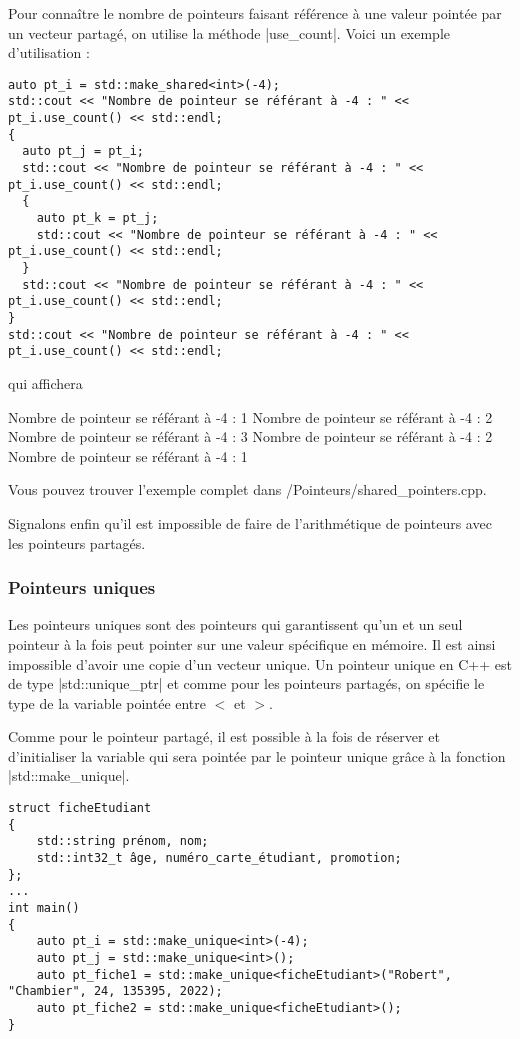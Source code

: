 Pour connaître le nombre de pointeurs faisant référence à une valeur pointée par un vecteur partagé,
on utilise la méthode |use_count|. Voici un exemple d'utilisation :
\begin{lstlisting}[caption=Lire le nombre de pointeur faisant référence à une valeur]
auto pt_i = std::make_shared<int>(-4);
std::cout << "Nombre de pointeur se référant à -4 : " << pt_i.use_count() << std::endl;
{
  auto pt_j = pt_i;
  std::cout << "Nombre de pointeur se référant à -4 : " << pt_i.use_count() << std::endl;
  {
    auto pt_k = pt_j;
    std::cout << "Nombre de pointeur se référant à -4 : " << pt_i.use_count() << std::endl;
  }
  std::cout << "Nombre de pointeur se référant à -4 : " << pt_i.use_count() << std::endl;
}
std::cout << "Nombre de pointeur se référant à -4 : " << pt_i.use_count() << std::endl;
\end{lstlisting}

qui affichera
\begin{inverseverbatim}
Nombre de pointeur se référant à -4 : 1
Nombre de pointeur se référant à -4 : 2
Nombre de pointeur se référant à -4 : 3
Nombre de pointeur se référant à -4 : 2
Nombre de pointeur se référant à -4 : 1
\end{inverseverbatim}

Vous pouvez trouver l'exemple complet dans \verb@Exemples/Pointeurs/shared_pointers.cpp\verb@.

Signalons enfin qu'il est impossible de faire de l'arithmétique de pointeurs avec les pointeurs partagés.

\subsubsection{Pointeurs uniques}

Les pointeurs uniques sont des pointeurs qui garantissent qu'un et un seul pointeur à la fois peut pointer sur une valeur spécifique en mémoire. Il est ainsi impossible d'avoir une copie d'un vecteur unique. Un pointeur unique en C++ est de type |std::unique_ptr| et comme pour les pointeurs partagés,
on spécifie le type de la variable pointée entre $<$ et $>$. 

Comme pour le pointeur partagé, il est possible à la fois de réserver et d'initialiser la variable
qui sera pointée par le pointeur unique grâce à la fonction |std::make_unique|.

\begin{lstlisting}[caption=Exemple d'utilisation des pointeurs uniques]
struct ficheEtudiant
{
    std::string prénom, nom;
    std::int32_t âge, numéro_carte_étudiant, promotion;
};
...
int main()
{
    auto pt_i = std::make_unique<int>(-4);
    auto pt_j = std::make_unique<int>();
    auto pt_fiche1 = std::make_unique<ficheEtudiant>("Robert", "Chambier", 24, 135395, 2022);
    auto pt_fiche2 = std::make_unique<ficheEtudiant>();
}
\end{lstlisting}

